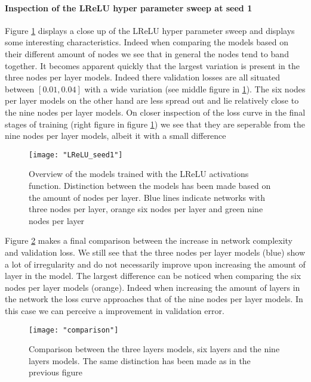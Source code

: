 \documentclass[12pt]{article}
\begin{document}
\paragraph{Inspection of the LReLU hyper parameter sweep at seed 1}
Figure \ref{fig:LReLU} displays a close up of the LReLU hyper parameter sweep and displays some interesting characteristics. Indeed when comparing the models based on their different amount of nodes we see that in general the nodes tend to band together. It becomes apparent quickly that the largest variation is present in the three nodes per layer models. Indeed there validation losses are all situated between $\left[0.01, 0.04\right]$ with a wide variation (see middle figure in \ref{fig:LReLU}). The six nodes per layer models on the other hand are less spread out and lie relatively close to the nine nodes per layer models. On closer inspection of the loss curve in the final stages of training (right figure in figure \ref{fig:LReLU}) we see that they are seperable from the nine nodes per layer models, albeit it with a small difference
\begin{figure}[H]
	\hspace*{-2cm}
	\centering
	\texttt{[image: "LReLU\_seed1"]}
	\caption{Overview of the models trained with the LReLU activations function. Distinction between the models has been made based on the amount of nodes per layer. Blue lines indicate networks with three nodes per layer, orange six nodes per layer and green nine nodes per layer}
	\label{fig:LReLU}
\end{figure}
Figure \ref{fig:comparison} makes a final comparison between the increase in network complexity and validation loss. We still see that the three nodes per layer models (blue) show a lot of irregularity and do not necessarily improve upon increasing the amount of layer in the model. The largest difference can be noticed when comparing the six nodes per layer models (orange). Indeed when increasing the amount of layers in the network the loss curve approaches that of the nine nodes per layer models. In this case we can perceive a improvement in validation error. 

\begin{figure}[H]
	\hspace*{-2cm}
	\centering
	\texttt{[image: "comparison"]}
	\caption{Comparison between the three layers models, six layers and the nine layers models. The same distinction has been made as in the previous figure}
	\label{fig:comparison}
\end{figure}
\\
\end{document}
